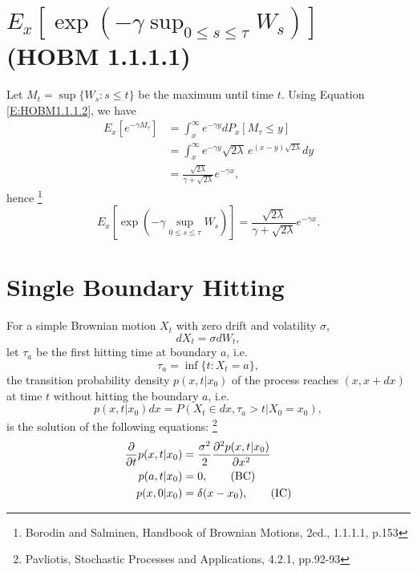 \section{ $E_x[ \exp(-\gamma \sup_{0\le s\le \tau} W_s) ]$ (HOBM 1.1.1.1) }
Let $M_t = \sup\{W_s: s\le t \}$ be the maximum until time $t$.
Using Equation \ref{E:HOBM1.1.1.2}, we have
\begin{align*}
  E_x[e^{-\gamma M_{\tau}}] 
    &= \int_x^{\infty} e^{-\gamma y} dP_x[M_{\tau}\le y] \\
    &= \int_x^{\infty} e^{-\gamma y} \sqrt{2\lambda}\, e^{(x-y)\sqrt{2\lambda}} dy \\ 
    &= \frac{\sqrt{2\lambda}}{\gamma+\sqrt{2\lambda}} e^{-\gamma x},
\end{align*}
hence
\footnote{Borodin and Salminen, Handbook of Brownian Motions, 2ed., 1.1.1.1,
p.153}
\begin{equation} \label{E:HOBM1.1.1.1}
  E_x[ \exp(-\gamma \sup_{0\le s\le \tau} W_s) ]
    = \frac{\sqrt{2\lambda}}{\gamma+\sqrt{2\lambda}} e^{-\gamma x}.
\end{equation}



\section{Single Boundary Hitting}

For a simple Brownian motion $X_t$ with zero drift and volatility $\sigma$,
\[
  dX_t = \sigma dW_t,
\]
let $\tau_a$ be the first hitting time at boundary $a$, i.e.
\[
  \tau_a = \inf\{t: X_t =a \},
\]
the transition probability density $p(x,t|x_0)$ of the process reaches 
$(x,x+dx)$ at time $t$ without hitting the boundary $a$, i.e.
\[
  p(x,t|x_0) dx=P(X_t\in dx, \tau_a>t | X_0=x_0),
\]
is the solution of the following equations:
\footnote{Pavliotis, Stochastic Processes and Applications, 4.2.1, pp.92-93}
\begin{align} \label{E:fp_nodrift}
  \frac{\partial}{\partial t} p(x,t|x_0)
    &= \frac{\sigma^2}{2} \frac{\partial^2 p(x,t|x_0)}{\partial x^2} \notag \\
  p(a,t|x_0) &= 0,  \qquad \text{(BC)}  \notag \\
  p(x,0|x_0) &= \delta (x-x_0),  \qquad \text{(IC)}  
\end{align}

